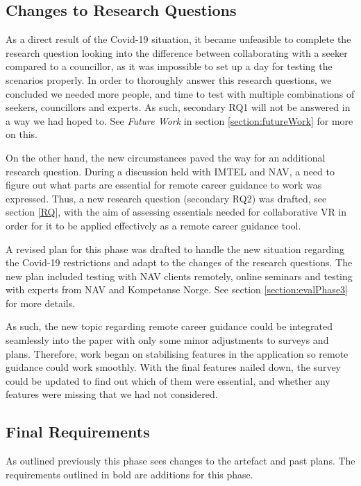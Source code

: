 \subsection{Changes to Research Questions}
As a direct result of the Covid-19 situation, it became unfeasible to complete the research question looking into the difference between collaborating with a seeker compared to a councillor, as it was impossible to set up a day for testing the scenarios properly. In order to thoroughly answer this research questions, we concluded we needed more people, and time to test with multiple combinations of seekers, councillors and experts. As such, secondary RQ1 will not be answered in a way we had hoped to. See \textit{Future Work} in section \ref{section:futureWork} for more on this.

On the other hand, the new circumstances paved the way for an additional research question. During a discussion held with IMTEL and NAV, a need to figure out what parts are essential for remote career guidance to work was expressed. Thus, a new research question (secondary RQ2) was drafted, see section \ref{RQ}, with the aim of assessing essentials needed for collaborative VR in order for it to be applied effectively as a remote career guidance tool. 

A revised plan for this phase was drafted to handle the new situation regarding the Covid-19 restrictions and adapt to the changes of the research questions. The new plan included testing with NAV clients remotely, online seminars and testing with experts from NAV and Kompetanse Norge. See section \ref{section:evalPhase3} for more details.    

As such, the new topic regarding remote career guidance could be integrated seamlessly into the paper with only some minor adjustments to surveys and plans. Therefore, work began on stabilising features in the application so remote guidance could work smoothly. With the final features nailed down, the survey could be updated to find out which of them were essential, and whether any features were missing that we had not considered.


\subsection{Final Requirements}
As outlined previously this phase sees changes to the artefact and past plans. The requirements outlined in bold are additions for this phase.

